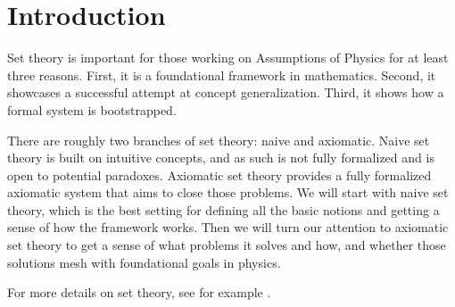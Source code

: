\documentclass{bareminimum}
\begin{document}
\maketitle
	
\section{Introduction}

Set theory is important for those working on Assumptions of Physics for at least three reasons. First, it is a foundational framework in mathematics. Second, it showcases a successful attempt at concept generalization. Third, it shows how a formal system is bootstrapped.

There are roughly two branches of set theory: naive and axiomatic. Naive set theory is built on intuitive concepts, and as such is not fully formalized and is open to potential paradoxes. Axiomatic set theory provides a fully formalized axiomatic system that aims to close those problems. We will start with naive set theory, which is the best setting for defining all the basic notions and getting a sense of how the framework works. Then we will turn our attention to axiomatic set theory to get a sense of what problems it solves and how, and whether those solutions mesh with foundational goals in physics.

For more details on set theory, see for example \cite{pinter2014book}.
\end{document}

